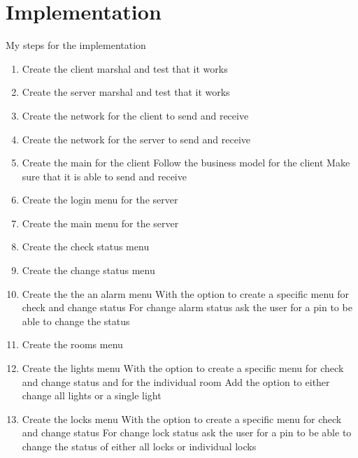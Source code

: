 \documentclass[11pt]{article}
\begin{document}
	\section{Implementation}
		My steps for the implementation
		\begin{enumerate}
			\item Create the client marshal and test that it works
			\item Create the server marshal and test that it works
			\item Create the network for the client to send and receive
			\item Create the network for the server to send and receive
			\item Create the main for the client
				\subitem Follow the business model for the client
				\subitem Make sure that it is able to send and receive
			\item Create the login menu for the server
			\item Create the main menu for the server
			\item Create the check status menu
			\item Create the change status menu
			\item Create the the an alarm menu
				\subitem With the option to create a specific menu for check and change status
				\subitem For change alarm status ask the user for a pin to be able to change the status
			\item Create the rooms menu
			\item Create the lights menu
				\subitem With the option to create a specific menu for check and change status and for the individual room
				\subitem Add the option to either change all lights or a single light
			\item Create the locks menu
				\subitem With the option to create a specific menu for check and change status
				\subitem For change lock status ask the user for a pin to be able to change the status of either all locks or individual locks
		\end{enumerate}
\end{document}
